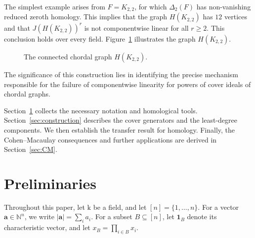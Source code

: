 \documentclass[12pt]{amsart}
\theoremstyle{definition}
\theoremstyle{remark}
\newcommand{\kk}{\mathrm{k}}
\begin{document}
The simplest example arises from $F = K_{2,2}$, for which $\Delta_2(F)$ has non-vanishing reduced zeroth homology. This implies that the graph $H(K_{2,2})$ has $12$ vertices and that $J(H(K_{2,2}))^r$ is not componentwise linear for all $r \ge 2$. This conclusion holds over every field. Figure~\ref{fig:graph} illustrates the graph $H(K_{2,2})$.

\begin{figure}[htbp]
\centering
{}
\caption{The connected chordal graph $H(K_{2,2})$.}
\label{fig:graph}
\end{figure}


The significance of this construction lies in identifying the precise mechanism responsible for the failure of componentwise linearity for powers of cover ideals of chordal graphs.

Section~\ref{sec:prelim} collects the necessary notation and homological tools. Section~\ref{sec:construction} describes the cover generators and the least-degree components. We then establish the transfer result for homology. Finally, the Cohen--Macaulay consequences and further applications are derived in Section~\ref{sec:CM}.

\section{Preliminaries}\label{sec:prelim}

Throughout this paper, let $\kk$ be a field, and let $[n] = \{1, \ldots, n\}$. For a vector $\mathbf{a} \in \mathbb{N}^n$, we write $|\mathbf{a}| = \sum_i a_i$. For a subset $B \subseteq [n]$, let $\mathbf{1}_B$ denote its characteristic vector, and let $x_B = \prod_{i \in B} x_i$.
\end{document}
